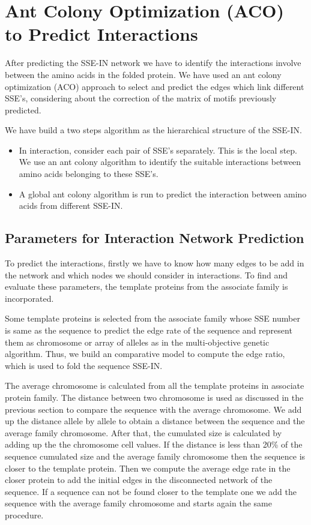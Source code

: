 \section {Ant Colony Optimization (ACO) to Predict Interactions}
After predicting the SSE-IN network we have to identify the interactions involve between the amino acids in the folded protein. We have used an ant colony optimization (ACO) approach to select and predict the edges which link different SSE's, considering about the correction of the matrix of motifs previously predicted. 

We have build a two steps algorithm as the hierarchical structure of the SSE-IN. 
\begin{itemize}
\item In interaction, consider each pair of SSE's separately. This is the local step. We use an ant colony algorithm to identify the suitable interactions between amino acids belonging to these SSE's.
\item A global ant colony algorithm is run to predict the interaction between amino acids from different SSE-IN.
\end{itemize}
\subsection {Parameters for Interaction Network Prediction}
To predict the interactions, firstly we have to know how many edges to be add in the network and which nodes we should consider in interactions. To find and evaluate these parameters, the template proteins from the associate family is incorporated.

Some template proteins is selected from the associate family whose SSE number is same as the sequence to predict the edge rate of the sequence and represent them as chromosome or array of alleles as in the multi-objective genetic algorithm. Thus, we build an comparative model to compute the edge ratio, which is used to fold the sequence SSE-IN.

The average chromosome is calculated from all the template proteins in associate protein family. The distance between two chromosome is used as discussed in the previous section to compare the sequence with the average chromosome.  We add up the distance allele by allele to obtain a distance between the sequence and the average family chromosome. After that, the cumulated size is calculated by adding up the the chromosome cell values. If the distance is less than 20\% of the sequence cumulated size and the average family chromosome then the sequence is closer to the template protein. Then we compute the average edge rate in the closer protein to add the initial edges in the disconnected network of the sequence. If a sequence can not be found closer to the template one we add the sequence with the average family chromosome and starts again the same procedure.

